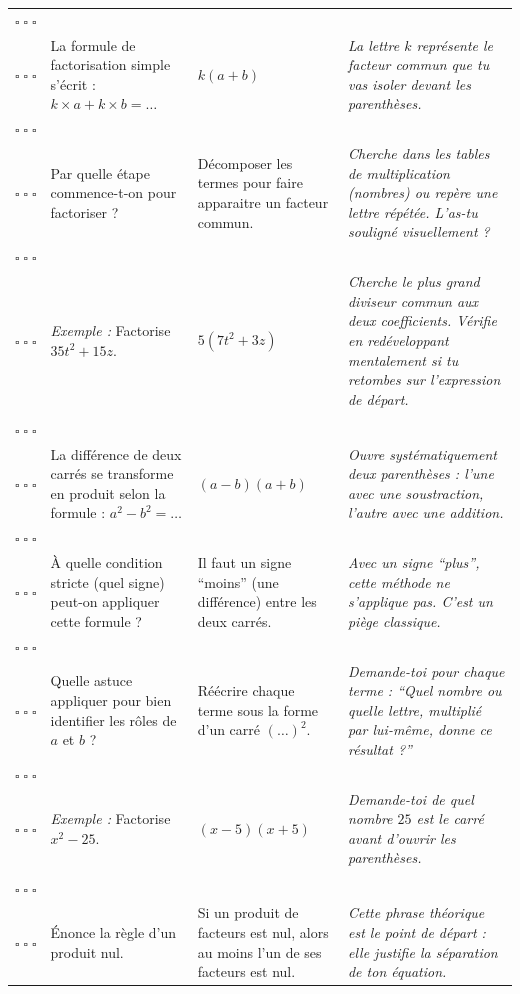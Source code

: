 \documentclass[a4paper,10pt]{article}
\newcommand{\caseseval}{%
    \centering
    $\square\;\square\;\square$ \\
    \vspace{2mm}
    $\square\;\square\;\square$
}
\begin{document}
\begin{center}
\begin{xltabular}{\dimexpr\textwidth-5pt\relax}{|m{2cm}|X|X|X|}
        \caseseval & La formule de factorisation simple s'écrit : $k \times a + k \times b = \dots$ & $k(a+b)$ & \footnotesize \textit{La lettre $k$ représente le facteur commun que tu vas isoler devant les parenthèses.} \\ \hline
        \caseseval & Par quelle étape commence-t-on pour factoriser ? & Décomposer les termes pour faire apparaitre un facteur commun. & \footnotesize \textit{Cherche dans les tables de multiplication (nombres) ou repère une lettre répétée. L'as-tu souligné visuellement ?} \\ \hline
        \caseseval & \textit{Exemple :} Factorise $35t^2 + 15z$. & $5(7t^2 + 3z)$ & \footnotesize \textit{Cherche le plus grand diviseur commun aux deux coefficients. Vérifie en redéveloppant mentalement si tu retombes sur l'expression de départ.} \\ \hline
         \\
        \hline
        \caseseval & La différence de deux carrés se transforme en produit selon la formule : $a^2 - b^2 = \dots$ & $(a-b)(a+b)$ & \footnotesize \textit{Ouvre systématiquement deux parenthèses : l'une avec une soustraction, l'autre avec une addition.} \\ \hline
        \caseseval & À quelle condition stricte (quel signe) peut-on appliquer cette formule ? & Il faut un signe ``moins'' (une différence) entre les deux carrés. & \footnotesize \textit{Avec un signe ``plus'', cette méthode ne s'applique pas. C'est un piège classique.} \\ \hline
        \caseseval & Quelle astuce appliquer pour bien identifier les rôles de $a$ et $b$ ? & Réécrire chaque terme sous la forme d'un carré $(\dots)^2$. & \footnotesize \textit{Demande-toi pour chaque terme : ``Quel nombre ou quelle lettre, multiplié par lui-même, donne ce résultat ?''} \\ \hline
        \caseseval & \textit{Exemple :} Factorise $x^2 - 25$. & $(x-5)(x+5)$ & \footnotesize \textit{Demande-toi de quel nombre $25$ est le carré avant d'ouvrir les parenthèses.} \\ \hline
         \\
        \hline
        \caseseval & Énonce la règle d'un produit nul. & Si un produit de facteurs est nul, alors au moins l'un de ses facteurs est nul. & \footnotesize \textit{Cette phrase théorique est le point de départ : elle justifie la séparation de ton équation.} \\ \hline

\end{xltabular}
\end{center}
\end{document}
